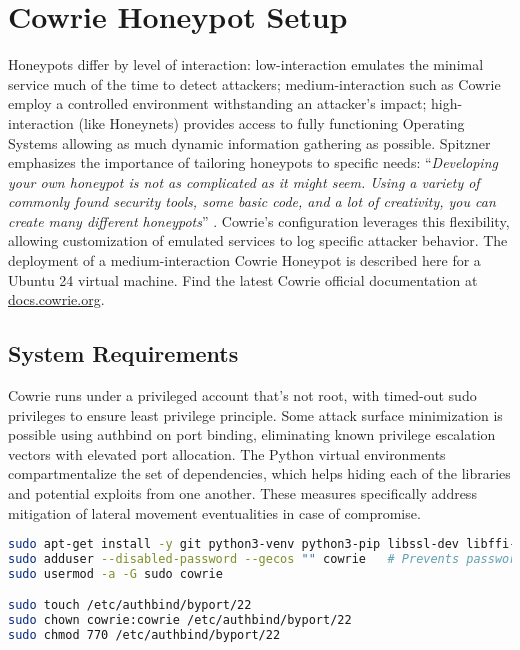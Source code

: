 \documentclass{cls/ULBreport}
\begin{document}
    \section{Cowrie Honeypot Setup}
    Honeypots differ by level of interaction: low-interaction emulates the minimal service much of the time to detect attackers; medium-interaction such as Cowrie employ a controlled environment withstanding an attacker's impact; high-interaction (like Honeynets) provides access to fully functioning Operating Systems allowing as much dynamic information gathering as possible.
    Spitzner emphasizes the importance of tailoring honeypots to specific needs: \enquote{\textit{Developing your own honeypot is not as complicated as it might seem. Using a variety of commonly found security tools, some basic code, and a lot of creativity, you can create many different honeypots}} \autocite[Ch.~9, p.~183]{spitzner2002honeypots}. Cowrie’s configuration leverages this flexibility, allowing customization of emulated services to log specific attacker behavior. The deployment of a medium-interaction Cowrie Honeypot is described here for a Ubuntu 24 virtual machine. Find the latest Cowrie official documentation at \href{https://docs.cowrie.org/en/latest/INSTALL.html}{docs.cowrie.org}.
    
\label{sec:cowrie}
    \subsection{System Requirements}
    Cowrie runs under a privileged account that's not root, with timed-out sudo privileges to ensure least privilege principle. Some attack surface minimization is possible using authbind on port binding, eliminating known privilege escalation vectors with elevated port allocation. The Python virtual environments compartmentalize the set of dependencies, which helps hiding each of the libraries and potential exploits from one another. These measures specifically address mitigation of lateral movement eventualities in case of compromise. 
    
    \begin{lstlisting}[language=bash,caption={Cowrie User Creation}]
sudo apt-get install -y git python3-venv python3-pip libssl-dev libffi-dev build-essential libpython3-dev authbind
sudo adduser --disabled-password --gecos "" cowrie   # Prevents password-based connections 
sudo usermod -a -G sudo cowrie

sudo touch /etc/authbind/byport/22
sudo chown cowrie:cowrie /etc/authbind/byport/22
sudo chmod 770 /etc/authbind/byport/22\end{lstlisting}
\end{document}
